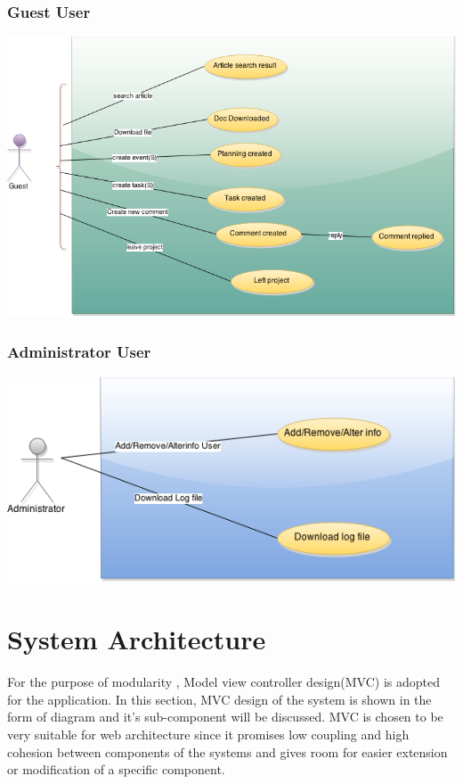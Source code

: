 \subsubsection{Guest User} 
\begin{center}
\includegraphics[scale=0.3]{./img/dsgn_img/USECASE4.png}
	
\end{center}

\subsubsection{Administrator User} 
\begin{center}
\includegraphics[scale=0.3]{./img/dsgn_img/USECASE3.png}
	
\end{center}


\section{System Architecture} %
\label{sec:system_architecture}
For the purpose of modularity , Model view controller design(MVC) is adopted for the application. In this section, MVC design of the system is shown in 
the form of diagram and it's sub-component will be discussed. MVC is chosen to be very suitable for web architecture since it promises low coupling and 
high cohesion between components of the systems and gives room for easier extension or modification of a specific component.
